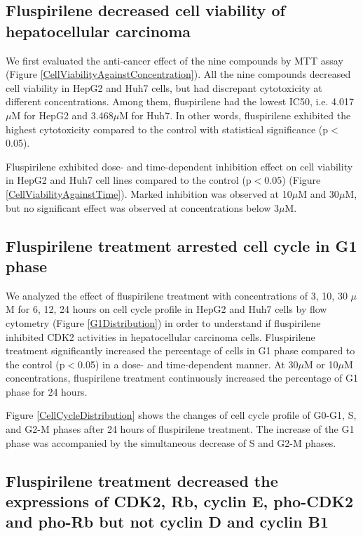 \documentclass[10pt]{article}
\begin{document}
\subsection*{Fluspirilene decreased cell viability of hepatocellular carcinoma}

We first evaluated the anti-cancer effect of the nine compounds by MTT assay (Figure \ref{CellViabilityAgainstConcentration}). All the nine compounds decreased cell viability in HepG2 and Huh7 cells, but had discrepant cytotoxicity at different concentrations. Among them, fluspirilene had the lowest IC50, i.e. 4.017$\mu$M for HepG2 and 3.468$\mu$M for Huh7. In other words, fluspirilene exhibited the highest cytotoxicity compared to the control with statistical significance (p$<$0.05).

Fluspirilene exhibited dose- and time-dependent inhibition effect on cell viability in HepG2 and Huh7 cell lines compared to the control (p$<$0.05) (Figure \ref{CellViabilityAgainstTime}). Marked inhibition was observed at 10$\mu$M and 30$\mu$M, but no significant effect was observed at concentrations below 3$\mu$M.

\subsection*{Fluspirilene treatment arrested cell cycle in G1 phase}

We analyzed the effect of fluspirilene treatment with concentrations of 3, 10, 30 $\mu$M for 6, 12, 24 hours on cell cycle profile in HepG2 and Huh7 cells by flow cytometry (Figure \ref{G1Distribution}) in order to understand if fluspirilene inhibited CDK2 activities in hepatocellular carcinoma cells. Fluspirilene treatment significantly increased the percentage of cells in G1 phase compared to the control (p$<$0.05) in a dose- and time-dependent manner. At 30$\mu$M or 10$\mu$M concentrations, fluspirilene treatment continuously increased the percentage of G1 phase for 24 hours.

Figure \ref{CellCycleDistribution} shows the changes of cell cycle profile of G0-G1, S, and G2-M phases after 24 hours of fluspirilene treatment. The increase of the G1 phase was accompanied by the simultaneous decrease of S and G2-M phases.

\subsection*{Fluspirilene treatment decreased the expressions of CDK2, Rb, cyclin E, pho-CDK2 and pho-Rb but not cyclin D and cyclin B1}
\end{document}
